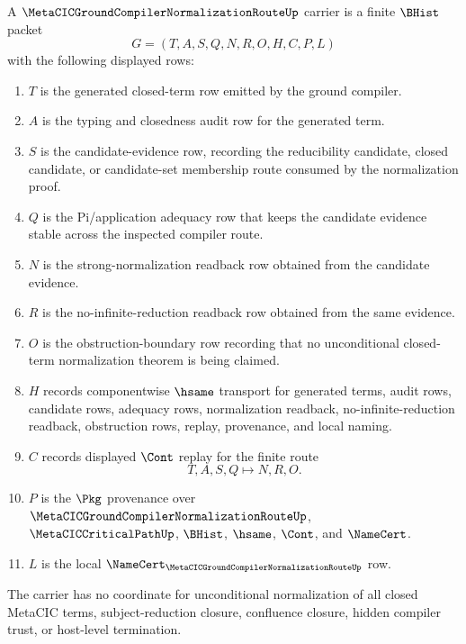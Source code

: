 \begin{definition}
\label{def:metacic-ground-compiler-normalization-route-carrier}
A $\MetaCICGroundCompilerNormalizationRouteUp$ carrier is a finite $\BHist$ packet
$$
G=(T,A,S,Q,N,R,O,H,C,P,L)
$$
with the following displayed rows:
\begin{enumerate}
\item $T$ is the generated closed-term row emitted by the ground compiler.
\item $A$ is the typing and closedness audit row for the generated term.
\item $S$ is the candidate-evidence row, recording the reducibility candidate, closed candidate, or candidate-set membership route consumed by the normalization proof.
\item $Q$ is the Pi/application adequacy row that keeps the candidate evidence stable across the inspected compiler route.
\item $N$ is the strong-normalization readback row obtained from the candidate evidence.
\item $R$ is the no-infinite-reduction readback row obtained from the same evidence.
\item $O$ is the obstruction-boundary row recording that no unconditional closed-term normalization theorem is being claimed.
\item $H$ records componentwise $\hsame$ transport for generated terms, audit rows, candidate rows, adequacy rows, normalization readback, no-infinite-reduction readback, obstruction rows, replay, provenance, and local naming.
\item $C$ records displayed $\Cont$ replay for the finite route
$$
T,A,S,Q \longmapsto N,R,O .
$$
\item $P$ is the $\Pkg$ provenance over $\MetaCICGroundCompilerNormalizationRouteUp$, $\MetaCICCriticalPathUp$, $\BHist$, $\hsame$, $\Cont$, and $\NameCert$.
\item $L$ is the local $\NameCert_{\MetaCICGroundCompilerNormalizationRouteUp}$ row.
\end{enumerate}
The carrier has no coordinate for unconditional normalization of all closed MetaCIC terms, subject-reduction closure, confluence closure, hidden compiler trust, or host-level termination.
\end{definition}

